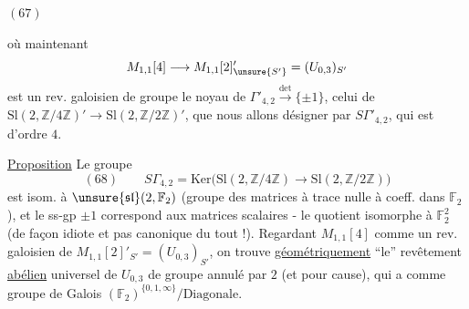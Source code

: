 
\begin{samepage}
\((67)\)
\end{samepage}

où maintenant
\[
M_{1,1}[4]\longrightarrow M_{1,1}[2]'_{\unsure{S'}}
=(U_{0,3})_{S'}
\]
est un rev. galoisien de groupe le noyau de
$\Gamma'_{4,2}\xrightarrow{\det}\{\pm1\}$,
 celui de
$\mathrm{Sl}(2,\mathbb Z/4\mathbb Z)'
\longrightarrow\mathrm{Sl}(2,\mathbb Z/2\mathbb Z)'$,
que nous allons désigner par $S\Gamma'_{4,2}$, qui est d'ordre $4$.

\uline{Proposition} Le groupe
\[
(68)\qquad
S\Gamma_{4,2}
=
\mathrm{Ker}\bigl(
\mathrm{Sl}(2,\mathbb Z/4\mathbb Z)
\longrightarrow
\mathrm{Sl}(2,\mathbb Z/2\mathbb Z)
\bigr)
\]
est isom. à 
$\unsure{\mathfrak{sl}}(2,\mathbb F_2)$
(groupe des matrices à trace nulle à coeff. dans $\mathbb F_2$),
et le ss-gp $\pm1$ correspond aux matrices scalaires -
le quotient 
isomorphe à  $\mathbb F_2^2$
(de façon idiote et pas canonique du tout !).
Regardant $M_{1,1}[4]$ comme un rev. galoisien de
$M_{1,1}[2]'_{S'}=(U_{0,3})_{S'}$, on trouve
\uline{géométriquement} ``le'' revêtement \uline{abélien} universel de
$U_{0,3}$ de groupe annulé par $2$ (et pour cause), qui a comme groupe
de Galois $(\mathbb F_2)^{\{0,1,\infty\}}/\mathrm{Diagonale}$.


